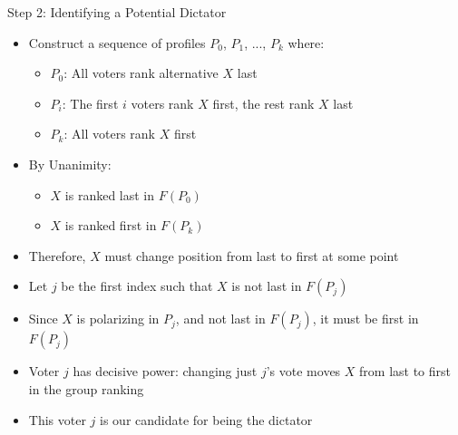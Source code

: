 \documentclass[10pt,handout]{beamer}
\begin{document}
\begin{frame}{Step 2: Identifying a Potential Dictator}
  \begin{itemize}[<+->]
    \item Construct a sequence of profiles $P_0$, $P_1$, ..., $P_k$ where:
      \begin{itemize}
        \item $P_0$: All voters rank alternative $X$ last
        \item $P_i$: The first $i$ voters rank $X$ first, the rest rank $X$ last
        \item $P_k$: All voters rank $X$ first
      \end{itemize}
    \item By Unanimity:
      \begin{itemize}
        \item $X$ is ranked last in $F(P_0)$
        \item $X$ is ranked first in $F(P_k)$
      \end{itemize}
    \item Therefore, $X$ must change position from last to first at some point
    \item Let $j$ be the first index such that $X$ is not last in $F(P_j)$
    \item Since $X$ is polarizing in $P_j$, and not last in $F(P_j)$, it must be first in $F(P_j)$
    \item Voter $j$ has decisive power: changing just $j$'s vote moves $X$ from last to first in the group ranking
    \item This voter $j$ is our candidate for being the dictator
  \end{itemize}
\end{frame}
\end{document}
